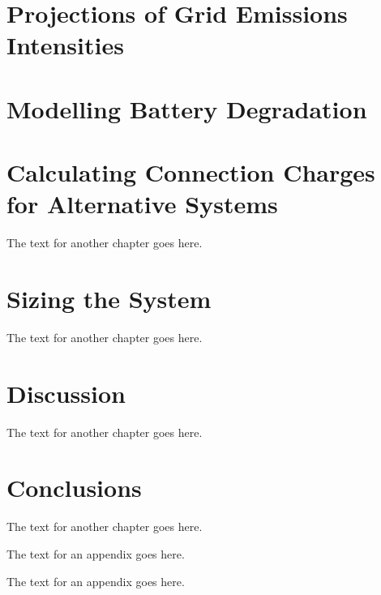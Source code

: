 \documentclass[a4paper]{18monthreport}
\begin{document}
\chapter{Projections of Grid Emissions Intensities}
\label{sec:Projections of Grid Emissions Intensities}
%

\chapter{Modelling Battery Degradation}
\label{sec:Modelling Battery Degradation}
%

\chapter{Calculating Connection Charges for Alternative Systems}
\label{sec:Calculating Connection Charges for Alternative Systems}
The text for another chapter goes here.

\chapter{Sizing the System}
\label{sec:Sizing the System}
The text for another chapter goes here.

\chapter{Discussion}
\label{sec:Discussion}
The text for another chapter goes here.

\chapter{Conclusions}
\label{sec:Conclusions}
The text for another chapter goes here.


\appendix{}
The text for an appendix goes here.

\appendix{}
The text for an appendix goes here.

\backmatter
{}

\end{document}
